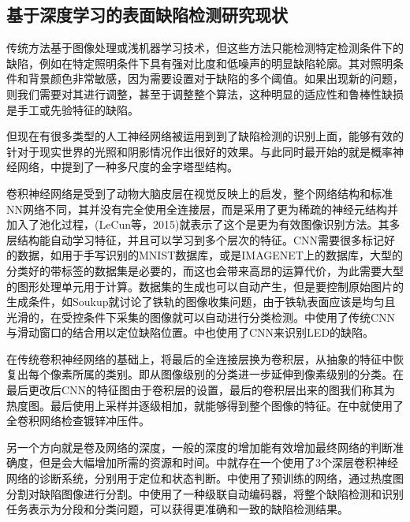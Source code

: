 \subsection{基于深度学习的表面缺陷检测研究现状}


传统方法基于图像处理或浅机器学习技术，但这些方法只能检测特定检测条件下的缺陷，例如在特定照明条件下具有强对比度和低噪声的明显缺陷轮廓。其对照明条件和背景颜色非常敏感，因为需要设置对于缺陷的多个阈值。如果出现新的问题，则我们需要对其进行调整，甚至于调整整个算法，这种明显的适应性和鲁棒性缺损是手工或先验特征的缺陷。

但现在有很多类型的人工神经网络被运用到到了缺陷检测的识别上面，能够有效的针对于现实世界的光照和阴影情况作出很好的效果。与此同时最开始的就是概率神经网络，\cite{6706920}中提到了一种多尺度的金字塔型结构。

卷积神经网络是受到了动物大脑皮层在视觉反映上的启发，整个网络结构和标准NN网络不同，其并没有完全使用全连接层，而是采用了更为稀疏的神经元结构并加入了池化过程，(LeCun等，2015)就表示了这个是更为有效图像识别方法。其多层结构能自动学习特征，并且可以学习到多个层次的特征。CNN需要很多标记好的数据，如用于手写识别的MNIST数据库，或是IMAGENET上的数据库，大型的分类好的带标签的数据集是必要的，而这也会带来高昂的运算代价，为此需要大型的图形处理单元用于计算。数据集的生成也可以自动产生，但是要控制原始图片的生成条件，如Soukup就讨论了铁轨的图像收集问题，由于铁轨表面应该是均匀且光滑的，在受控条件下采集的图像就可以自动进行分类检测。\cite{Wang2018}中使用了传统CNN与滑动窗口的结合用以定位缺陷位置。\cite{Lin2018}中也使用了CNN来识别LED的缺陷。

在传统卷积神经网络的基础上，将最后的全连接层换为卷积层，从抽象的特征中恢复出每个像素所属的类别。即从图像级别的分类进一步延伸到像素级别的分类。在最后更改后CNN的特征图由于卷积层的设置，最后的卷积层出来的图我们称其为热度图。最后使用上采样并逐级相加，就能够得到整个图像的特征。在\cite{2018SPIE10615E0KX}中就使用了全卷积网络检查镀锌冲压件。

另一个方向就是卷及网络的深度，一般的深度的增加能有效增加最终网络的判断准确度，但是会大幅增加所需的资源和时间。\cite{8126877}中就存在一个使用了3个深层卷积神经网络的诊断系统，分别用于定位和状态判断。\cite{7864335}中使用了预训练的网络，通过热度图分割对缺陷图像进行分割。\cite{app8091575}中使用了一种级联自动编码器，将整个缺陷检测和识别任务表示为分段和分类问题，可以获得更准确和一致的缺陷检测结果。

